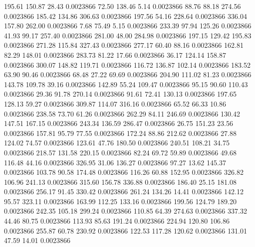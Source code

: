     195.61    150.87     28.43  0.0023866
     72.50    138.46      5.14  0.0023866
     88.76     88.18    274.56  0.0023866
    185.42    134.86    306.63  0.0023866
    197.56     54.16    228.64  0.0023866
    336.04    157.80    262.00  0.0023866
      7.68     75.49      5.15  0.0023866
    233.39     97.94    125.26  0.0023866
     41.93     99.17    257.40  0.0023866
    281.00     48.00    284.98  0.0023866
    197.15    129.42    195.83  0.0023866
    271.28    115.84    327.43  0.0023866
    277.17     60.40     88.16  0.0023866
    162.81     82.29    148.01  0.0023866
    283.73     81.22     17.66  0.0023866
     36.17    124.14    158.87  0.0023866
    300.07    148.82    119.71  0.0023866
    116.72    136.87    102.14  0.0023866
    183.52     63.90     90.46  0.0023866
     68.48     27.22     69.69  0.0023866
    204.90    111.02     81.23  0.0023866
    143.78    109.78     39.16  0.0023866
    142.89     55.24    109.47  0.0023866
     95.15     90.60    110.43  0.0023866
     29.36     91.78    270.14  0.0023866
     91.61     72.41    130.13  0.0023866
    197.65    128.13     59.27  0.0023866
    309.87    114.07    316.16  0.0023866
     65.52     66.33     10.86  0.0023866
    238.58     73.70     61.26  0.0023866
    262.29     84.11    246.69  0.0023866
    130.42    147.51    167.15  0.0023866
    243.34    136.59    286.47  0.0023866
     26.75    151.23     23.56  0.0023866
    157.81     95.79     77.55  0.0023866
    172.24     88.86    212.62  0.0023866
     27.88    124.02     74.57  0.0023866
    123.61     47.76    180.50  0.0023866
    240.51    108.21     34.75  0.0023866
    218.57    131.58    220.15  0.0023866
     82.24     69.72     59.89  0.0023866
     49.68    116.48     44.16  0.0023866
    326.95     31.06    136.27  0.0023866
     97.27     13.62    145.37  0.0023866
    103.78     90.58    174.48  0.0023866
    116.26     60.88    152.95  0.0023866
    326.82    106.96    241.13  0.0023866
    315.60    156.78    336.88  0.0023866
    186.40     25.15    181.08  0.0023866
    256.17     91.45    330.42  0.0023866
    261.24    134.26     14.41  0.0023866
    142.12     95.57    323.11  0.0023866
    163.99    112.25    133.16  0.0023866
    199.56    124.79    189.20  0.0023866
    242.35    105.18    299.24  0.0023866
    110.85     64.39    274.63  0.0023866
    337.32     44.46     80.75  0.0023866
    113.93     85.63    191.24  0.0023866
    224.94    120.80    106.86  0.0023866
    255.87     60.78    230.92  0.0023866
    122.53    117.28    120.62  0.0023866
    131.01     47.59     14.01  0.0023866
